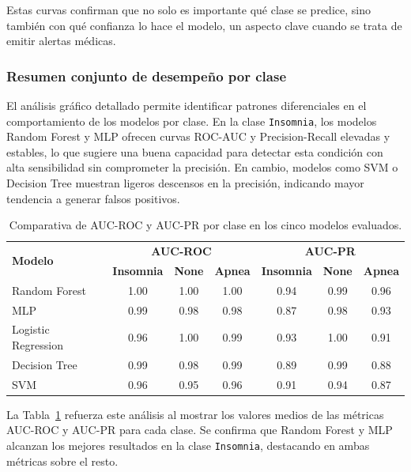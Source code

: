 Estas curvas confirman que no solo es importante qué clase se predice, sino también con qué confianza lo hace el modelo, un aspecto clave cuando se trata de emitir alertas médicas.


\subsubsection{Resumen conjunto de desempeño por clase}

El análisis gráfico detallado permite identificar patrones diferenciales en el comportamiento de los modelos por clase. En la clase \texttt{Insomnia}, los modelos Random Forest y MLP ofrecen curvas ROC-AUC y Precision-Recall elevadas y estables, lo que sugiere una buena capacidad para detectar esta condición con alta sensibilidad sin comprometer la precisión. En cambio, modelos como SVM o Decision Tree muestran ligeros descensos en la precisión, indicando mayor tendencia a generar falsos positivos.

\begin{table}[H]
\centering
\small
\begin{tabular}{lccc|ccc}
\toprule
\multirow{2}{*}{\textbf{Modelo}} & \multicolumn{3}{c|}{\textbf{AUC-ROC}} & \multicolumn{3}{c}{\textbf{AUC-PR}} \\
& \textbf{Insomnia} & \textbf{None} & \textbf{Apnea} & \textbf{Insomnia} & \textbf{None} & \textbf{Apnea} \\
\midrule
Random Forest       & 1.00 & 1.00 & 1.00 & 0.94 & 0.99 & 0.96 \\
MLP                 & 0.99 & 0.98 & 0.98 & 0.87 & 0.98 & 0.93 \\
Logistic Regression & 0.96 & 1.00 & 0.99 & 0.93 & 1.00 & 0.91 \\
Decision Tree       & 0.99 & 0.98 & 0.99 & 0.89 & 0.99 & 0.88 \\
SVM                 & 0.96 & 0.95 & 0.96 & 0.91 & 0.94 & 0.87 \\
\bottomrule
\end{tabular}
\caption{Comparativa de AUC-ROC y AUC-PR por clase en los cinco modelos evaluados.}
\label{tab:auc-por-clase}
\end{table}

La Tabla~\ref{tab:auc-por-clase} refuerza este análisis al mostrar los valores medios de las métricas AUC-ROC y AUC-PR para cada clase. Se confirma que Random Forest y MLP alcanzan los mejores resultados en la clase \texttt{Insomnia}, destacando en ambas métricas sobre el resto.

